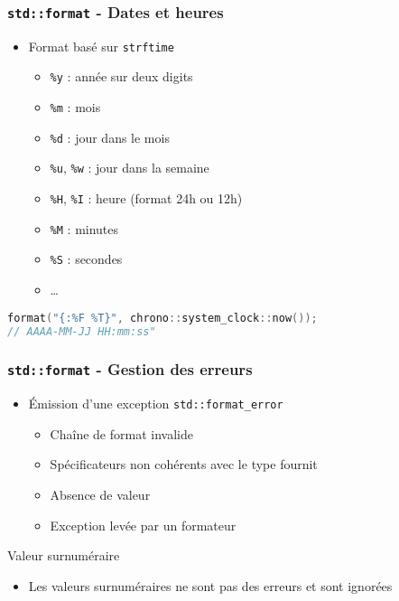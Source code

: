 \documentclass[C++.tex]{subfiles}
\begin{document}
\begin{frame}[fragile]
	\frametitle{\lstinline|std::format| - Dates et heures}
	\begin{itemize}
		\item Format basé sur \lstinline|strftime|
		\begin{itemize}
			\item \lstinline|%y| : année sur deux digits
			\item \lstinline|%m| : mois
			\item \lstinline|%d| : jour dans le mois
			\item \lstinline|%u|, \lstinline|%w| : jour dans la semaine


			\item \lstinline|%H|, \lstinline|%I| : heure (format 24h ou 12h)

			
			\item \lstinline|%M| : minutes
			\item \lstinline|%S| : secondes
			\item \ldots
		\end{itemize}
	\end{itemize}

	\begin{lstlisting}[language=C++]
format("{:%F %T}", chrono::system_clock::now());
// AAAA-MM-JJ HH:mm:ss"\end{lstlisting}
\end{frame}

\begin{frame}[fragile]
	\frametitle{\lstinline|std::format| - Gestion des erreurs}
	\begin{itemize}
		\item Émission d'une exception \lstinline|std::format_error|
		\begin{itemize}
			\item Chaîne de format invalide
			\item Spécificateurs non cohérents avec le type fournit
			\item Absence de valeur
			\item Exception levée par un formateur
		\end{itemize}
	\end{itemize}

	\begin{block}{Valeur surnuméraire}
		\begin{itemize}
			\item Les valeurs surnuméraires ne sont pas des erreurs et sont ignorées
		\end{itemize}
	\end{block}
\end{frame}
\end{document}
